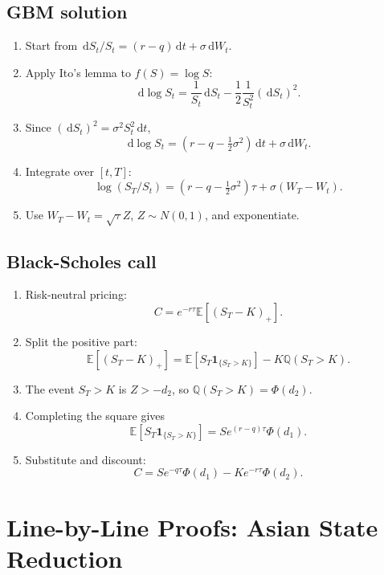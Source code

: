 \documentclass[11pt,oneside]{book}
\theoremstyle{definition}
\newenvironment{proofsteps}
{\begin{enumerate}[label=\textbf{Line \arabic*.}, itemsep=0.35em]}
{\end{enumerate}}
\newcommand{\E}{\mathbb{E}}
\newcommand{\Q}{\mathbb{Q}}
\newcommand{\dd}{\,\mathrm{d}}
\begin{document}
\section{GBM solution}
\begin{proofsteps}
\item Start from \(\dd S_t/S_t=(r-q)\dd t+\sigma\dd W_t\).
\item Apply Ito's lemma to \(f(S)=\log S\):
\[
\dd\log S_t
=\frac1{S_t}\dd S_t-\frac12\frac1{S_t^2}(\dd S_t)^2.
\]
\item Since \((\dd S_t)^2=\sigma^2S_t^2\dd t\),
\[
\dd\log S_t=(r-q-\tfrac12\sigma^2)\dd t+\sigma\dd W_t.
\]
\item Integrate over \([t,T]\):
\[
\log(S_T/S_t)=(r-q-\tfrac12\sigma^2)\tau+\sigma(W_T-W_t).
\]
\item Use \(W_T-W_t=\sqrt{\tau}Z\), \(Z\sim N(0,1)\), and exponentiate.
\end{proofsteps}

\section{Black-Scholes call}
\begin{proofsteps}
\item Risk-neutral pricing:
\[
C=e^{-r\tau}\E[(S_T-K)_+].
\]
\item Split the positive part:
\[
\E[(S_T-K)_+]
=\E[S_T\mathbf 1_{\{S_T>K\}}]-K\Q(S_T>K).
\]
\item The event \(S_T>K\) is \(Z>-d_2\), so \(\Q(S_T>K)=\Phi(d_2)\).
\item Completing the square gives
\[
\E[S_T\mathbf 1_{\{S_T>K\}}]
=S e^{(r-q)\tau}\Phi(d_1).
\]
\item Substitute and discount:
\[
C=S e^{-q\tau}\Phi(d_1)-K e^{-r\tau}\Phi(d_2).
\]
\end{proofsteps}

\chapter{Line-by-Line Proofs: Asian State Reduction}
\end{document}
